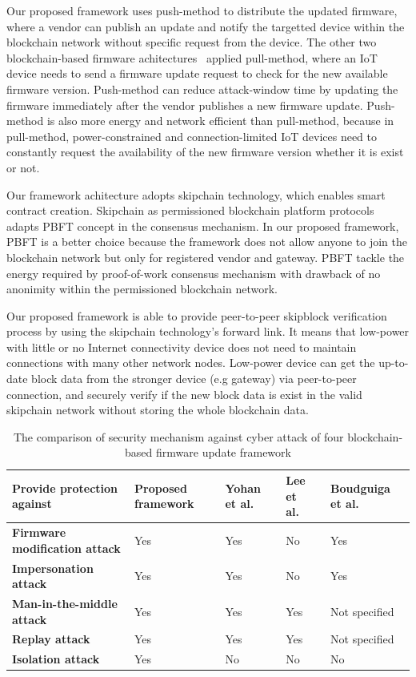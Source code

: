 Our proposed framework uses push-method to distribute the updated firmware, where a vendor can publish an update and notify the targetted device within the blockchain network without specific request from the device. The other two blockchain-based firmware achitectures~\cite{lee,boudguiga} applied pull-method, where an IoT device needs to send a firmware update request to check for the new available firmware version. Push-method can reduce attack-window time by updating the firmware immediately after the vendor publishes a new firmware update. Push-method is also more energy and network efficient than pull-method, because in pull-method, power-constrained and connection-limited IoT devices need to constantly request the availability of the new firmware version whether it is exist or not.

Our framework achitecture adopts skipchain technology, which enables smart contract creation. Skipchain as permissioned blockchain platform protocols adapts PBFT concept in the consensus mechanism. In our proposed framework, PBFT is a better choice because the framework does not allow anyone to join the blockchain network but only for registered vendor and gateway. PBFT tackle the energy required by proof-of-work consensus mechanism with drawback of no anonimity within the permissioned blockchain network.

Our proposed framework is able to provide peer-to-peer skipblock verification process by using the skipchain technology's forward link. It means that low-power with little or no Internet connectivity device does not need to maintain connections with many other network nodes. Low-power device can get the up-to-date block data from the stronger device (e.g gateway) via peer-to-peer connection, and securely verify if the new block data is exist in the valid skipchain network without storing the whole blockchain data.

\begin{table}[htb]
	\caption{The comparison of security mechanism against cyber attack of four blockchain-based firmware update framework}
	\label{tab:securityComparison}
	\begin{adjustbox}{max width=1\textwidth,center}
		\begin{tabular}{|l|l|l|l|l|}
			\hline
			\textbf{Provide protection against} & \textbf{Proposed framework} & \textbf{Yohan et al.~\cite{yohan}} & \textbf{Lee et al.~\cite{lee}} & \textbf{Boudguiga et al.~\cite{lee}}\\ \hline
			\textbf{Firmware modification attack} & Yes & Yes & No & Yes\\ \hline
			\textbf{Impersonation attack} & Yes & Yes & No & Yes\\ \hline
			\textbf{Man-in-the-middle attack} & Yes & Yes & Yes & Not specified\\ \hline
			\textbf{Replay attack} & Yes & Yes & Yes & Not specified\\ \hline
			\textbf{Isolation attack} & Yes & No & No & No\\ \hline
		\end{tabular}
	\end{adjustbox}
\end{table}


